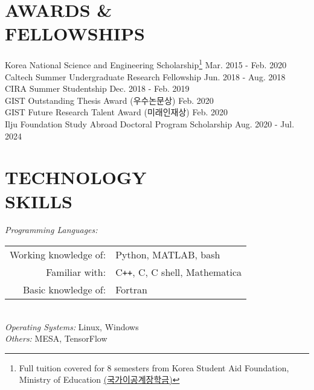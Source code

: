 \documentclass[margin, 10pt]{res} %
\begin{document}
\begin{resume}

\section{AWARDS \& \\ FELLOWSHIPS}
Korea National Science and Engineering Scholarship\footnote{Full tuition covered for 8 semesters from Korea Student Aid Foundation, Ministry of Education \href{https://www.gov.kr/portal/service/serviceInfo/B55252900005}{(국가이공계장학금)}} \hfill Mar. 2015 - Feb. 2020\\
Caltech Summer Undergraduate Research Fellowship \hfill Jun. 2018 - Aug. 2018\\
CIRA Summer Studentship \hfill Dec. 2018 - Feb. 2019\\
GIST Outstanding Thesis Award (우수논문상) \hfill Feb. 2020\\
GIST Future Research Talent Award (미래인재상) \hfill Feb. 2020\\
Ilju Foundation Study Abroad Doctoral Program Scholarship \hfill Aug. 2020 - Jul. 2024



\section{TECHNOLOGY \\ SKILLS} 

{\sl Programming Languages:}\\%
\begin{tabular}{rl}
    Working knowledge of:& Python, MATLAB, bash\\
    Familiar with:& C\texttt{++}, C, C shell, Mathematica\\
     Basic knowledge of:& Fortran\\
\end{tabular}\\
{\sl Operating Systems:} Linux, Windows \\
{\sl Others:} MESA, TensorFlow\\
 

\end{resume}
\end{document}
